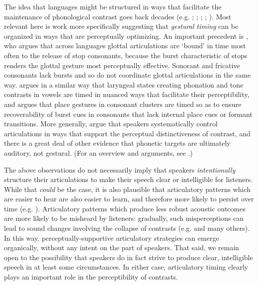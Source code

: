\documentclass[output=paper,colorlinks,citecolor=brown]{langscibook}
\begin{document}
The idea that languages might be structured in ways that facilitate the maintenance of phonological contrast goes back decades (e.g. \cite{Martinet1952_functional_load}; \citeyear{Martinet:1964}; \cite{Liljencrants_Lindblom1972_V_inventories}; \cite{Lindblom1986_V_system_universals}; \citeyear{Lindblom1990_HH_theory}). Most relevant here is work more specifically suggesting that \emph{gestural timing} can be organized in ways that are perceptually optimizing. An important precedent is \citet{Kingston1990_artic_binding}, who argues that across languages glottal articulations are `bound' in time most often to the release of stop consonants, because the burst characteristic of stops renders the glottal gesture most perceptually effective. Sonorant and fricative consonants lack bursts and so do not coordinate glottal articulations in the same way. \citet{Silverman1997_laryng_compl} argues in a similar way that laryngeal states creating phonation and tone contrasts in vowels are timed in nuanced ways that facilitate their perceptibility, and \citet{Wright:1996_cue_preserv} argues that place gestures in consonant clusters are timed so as to ensure recoverability of burst cues in consonants that lack internal place cues or formant transitions. More generally, \citet{Kingston_Diehl1994_phonetic_knowledge} argue that speakers systematically control articulations in ways that support the perceptual distinctiveness of contrast, and there is a great deal of other evidence that phonetic targets are ultimately auditory, not gestural. (For an overview and arguments, see \citealt{Kingston:2019_interface}.)

The above observations do not necessarily imply that speakers \emph{intentionally} structure their articulations to make their speech clear or intelligible for listeners. While that \emph{could} be the case, it is also plausible that articulatory patterns which are easier to hear are also easier to learn, and therefore more likely to persist over time (e.g. \citealt{Ohala1993_coarticulation}). Articulatory patterns which produce less robust acoustic outcomes are more likely to be misheard by listeners: gradually, such misperceptions can lead to sound changes involving the collapse of contrasts (e.g. \citealt{Ohala1981_listener_sound_change} and many others). In this way, perceptually-supportive articulatory strategies can emerge organically, without any intent on the part of speakers. That said, we remain open to the possibility that speakers do in fact strive to produce clear, intelligible speech in at least some circumstances. In either case, articulatory timing clearly plays an important role in the perceptibility of contrasts.
\end{document}
